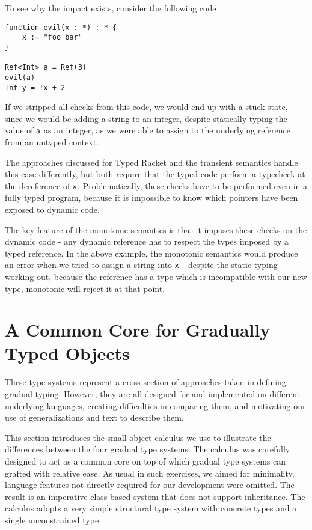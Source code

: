 \documentclass[preprint]{sigplanconf}
\newcommand{\x}{\M{\xt{x}}}
\renewcommand{\a}{\M{\xt a}}
\newcommand{\M}[1]{\ensuremath{#1}\xspace}
\newcommand{\xt}[1]{{\sf{#1}}\xspace}
\begin{document}
To see why the impact exists, consider the following code

\begin{verbatim}
function evil(x : *) : * {
	x := "foo bar"
}

Ref<Int> a = Ref(3)
evil(a)
Int y = !x + 2
\end{verbatim}

If we stripped all checks from this code, we would end up with a stuck
state, since we would be adding a string to an integer, despite statically
typing the value of $\a$ as an integer, as we were able to assign to the
underlying reference from an untyped context.

The approaches discussed for Typed Racket and the transient semantics
handle this case differently, but both require that the typed code perform
a typecheck at the dereference of $\x$. Problematically, these checks
have to be performed even in a fully typed program, because it is impossible
to know which pointers have been exposed to dynamic code.

The key feature of the monotonic semantics is that it imposes these checks 
on the dynamic code - any dynamic reference has to respect the types imposed
by a typed reference. In the above example, the monotonic semantics would
produce an error when we tried to assign a string into $\x$ - despite the 
static typing working out, because the reference has a type which is incompatible
with our new type, monotonic will reject it at that point.
\section{A Common Core for Gradually Typed Objects}

These type systems represent a cross section of approaches taken in defining
gradual typing. However, they are all designed for and implemented on different
underlying languages, creating difficulties in comparing them, and motivating
our use of generalizations and text to describe them.

This section introduces the small object calculus we use to illustrate the
differences between the four gradual type systems.  The calculus was
carefully designed to act as a common core on top of which gradual type
systems can grafted with relative ease. As usual in such exercises, we aimed
for minimality, language features not directly required for our development
were omitted. The result is an imperative class-based system that does not
support inheritance. The calculus adopts a very simple structural type
system with concrete types and a single unconstrained type.
\end{document}

